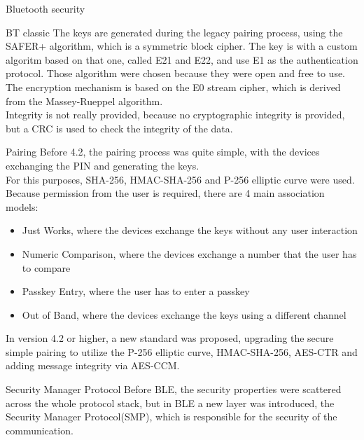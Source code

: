\begin{section}{Bluetooth security}
\begin{subsection}{BT classic}
    The keys are generated during the legacy pairing process, using the SAFER+ algorithm, which is
    a symmetric block cipher. The key is with a custom algoritm based on that one, called E21 and
    E22, and use E1 as the authentication protocol. Those algorithm were chosen because they were
    open and free to use.\\
    The encryption mechanism is based on the E0 stream cipher, which is derived from the
    Massey-Rueppel algorithm.\\
    Integrity is not really provided, because no cryptographic integrity is provided, but a CRC is
    used to check the integrity of the data.
    \begin{subsubsection}{Pairing}
      Before 4.2, the pairing process was quite simple, with the devices exchanging the PIN and
      generating the keys.\\
      For this purposes, SHA-256, HMAC-SHA-256 and P-256 elliptic curve were used.\\
      Because permission from the user is required, there are 4 main association models:
      \begin{itemize}
        \item Just Works, where the devices exchange the keys without any user interaction
        \item Numeric Comparison, where the devices exchange a number that the user has to compare
        \item Passkey Entry, where the user has to enter a passkey
        \item Out of Band, where the devices exchange the keys using a different channel
      \end{itemize}
      In version 4.2 or higher, a new standard was proposed, upgrading the secure simple pairing
      to utilize the P-256 elliptic curve, HMAC-SHA-256, AES-CTR and adding message integrity via 
      AES-CCM.
    \end{subsubsection}
  \end{subsection}
  \begin{subsection}{Security Manager Protocol}
    Before BLE, the security properties were scattered across the whole protocol stack, but in BLE
    a new layer was introduced, the Security Manager Protocol(SMP), which is responsible for the
    security of the communication.\\


\end{subsection}
\end{section}
